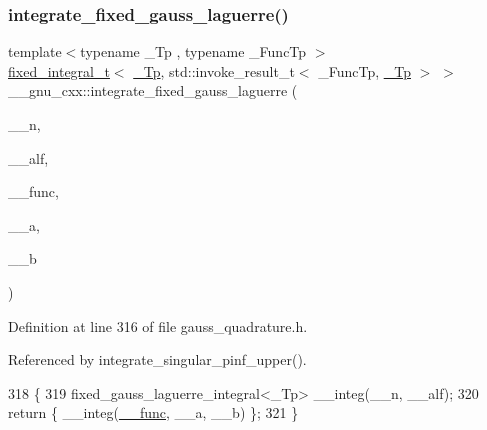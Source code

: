 \subsubsection{\texorpdfstring{integrate\+\_\+fixed\+\_\+gauss\+\_\+laguerre()}{integrate\_fixed\_gauss\_laguerre()}}
{\footnotesize\ttfamily template$<$typename \+\_\+\+Tp , typename \+\_\+\+Func\+Tp $>$ \\
\hyperlink{struct____gnu__cxx_1_1fixed__integral__t}{fixed\+\_\+integral\+\_\+t}$<$ \hyperlink{namespace____gnu__cxx_a3b19a9c800ca194374ef9172290f7d79}{\+\_\+\+Tp}, std\+::invoke\+\_\+result\+\_\+t$<$ \+\_\+\+Func\+Tp, \hyperlink{namespace____gnu__cxx_a3b19a9c800ca194374ef9172290f7d79}{\+\_\+\+Tp} $>$ $>$ \+\_\+\+\_\+gnu\+\_\+cxx\+::integrate\+\_\+fixed\+\_\+gauss\+\_\+laguerre (\begin{DoxyParamCaption}\item[{int}]{\+\_\+\+\_\+n,  }\item[{\hyperlink{namespace____gnu__cxx_a3b19a9c800ca194374ef9172290f7d79}{\+\_\+\+Tp}}]{\+\_\+\+\_\+alf,  }\item[{\+\_\+\+Func\+Tp}]{\+\_\+\+\_\+func,  }\item[{\hyperlink{namespace____gnu__cxx_a3b19a9c800ca194374ef9172290f7d79}{\+\_\+\+Tp}}]{\+\_\+\+\_\+a,  }\item[{\hyperlink{namespace____gnu__cxx_a3b19a9c800ca194374ef9172290f7d79}{\+\_\+\+Tp}}]{\+\_\+\+\_\+b }\end{DoxyParamCaption})}



Definition at line 316 of file gauss\+\_\+quadrature.\+h.



Referenced by integrate\+\_\+singular\+\_\+pinf\+\_\+upper().


\begin{DoxyCode}
318     \{
319       fixed\_gauss\_laguerre\_integral<\_Tp> \_\_integ(\_\_n, \_\_alf);
320       \textcolor{keywordflow}{return} \{ \_\_integ(\hyperlink{namespace____gnu__cxx_af2b2f0c7a2ae72b922b1afefae5a65b2}{\_\_func}, \_\_a, \_\_b) \};
321     \}
\end{DoxyCode}
\mbox{\label{namespace____gnu__cxx_a9115896dfa9f35b53dbb720347a69a1c}} 
